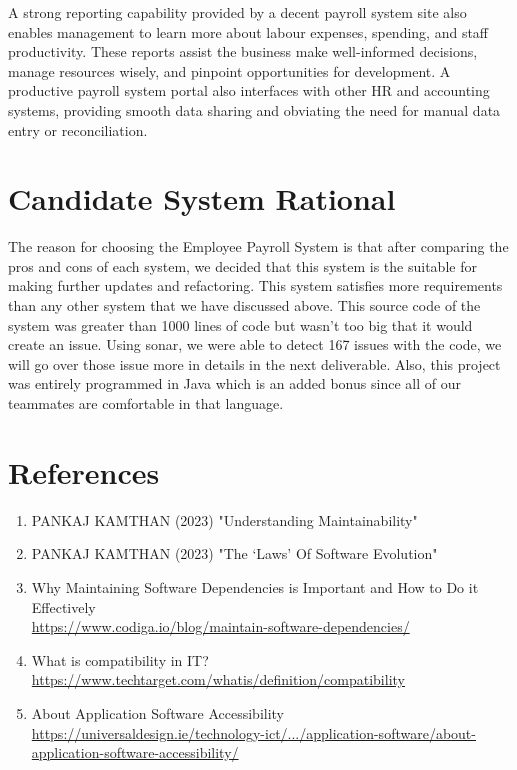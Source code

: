\documentclass[12pt,english]{article}
\begin{document}
A strong reporting capability provided by a decent payroll system site also enables management to learn more about labour expenses, spending, and staff productivity. These reports assist the business make well-informed decisions, manage resources wisely, and pinpoint opportunities for development. A productive payroll system portal also interfaces with other HR and accounting systems, providing smooth data sharing and obviating the need for manual data entry or reconciliation.


\section{Candidate System Rational}
The reason for choosing the Employee Payroll System is that after comparing the pros and cons of each system, we decided that this system is the suitable for making further updates and refactoring. This system satisfies more requirements than any other system that we have discussed above. This source code of the system was greater than 1000 lines of code but wasn't too big that it would create an issue. Using sonar, we were able to detect 167 issues with the code, we will go over those issue more in details in the next deliverable. Also, this project was entirely programmed in Java which is an added bonus since all of our teammates are comfortable in that language. 

\newpage

\section{References}

\begin{enumerate}
    \item PANKAJ KAMTHAN (2023) "Understanding Maintainability"
    \item PANKAJ KAMTHAN (2023) "The ‘Laws’ Of Software Evolution"
    \item Why Maintaining Software Dependencies is Important and How to Do it Effectively\\ \href{https://www.codiga.io/blog/maintain-software-dependencies/}{https://www.codiga.io/blog/maintain-software-dependencies/}
    \item What is compatibility in IT? \\ \href{https://www.techtarget.com/whatis/definition/compatibility}{https://www.techtarget.com/whatis/definition/compatibility}
    \item About Application Software Accessibility \\ \href{https://universaldesign.ie/technology-ict/archive-irish-national-it-accessibility-guidelines/application-software/about-application-software-accessibility/}{https://universaldesign.ie/technology-ict/.../application-software/about-application-software-accessibility/}
\end{enumerate}
\end{document}
